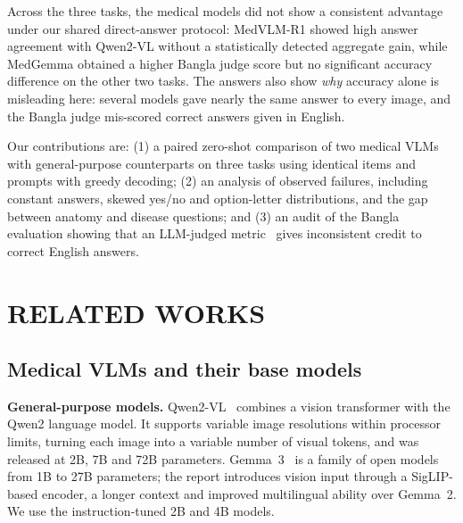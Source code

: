 \documentclass[doublecolumn]{ijcvsplatex}
\newcommand{\qwen}{Qwen2-VL}
\newcommand{\medvlm}{MedVLM-R1}
\newcommand{\gemma}{Gemma~3}
\newcommand{\medgemma}{MedGemma}
\begin{document}
Across the three tasks, the medical models did not show a consistent advantage under our shared direct-answer protocol: \medvlm{} showed high answer agreement with \qwen{} without a statistically detected aggregate gain, while \medgemma{} obtained a higher Bangla judge score but no significant accuracy difference on the other two tasks. The answers also show \emph{why} accuracy alone is misleading here: several models gave nearly the same answer to every image, and the Bangla judge mis-scored correct answers given in English.

Our contributions are: (1) a paired zero-shot comparison of two medical VLMs with general-purpose counterparts on three tasks using identical items and prompts with greedy decoding; (2) an analysis of observed failures, including constant answers, skewed yes/no and option-letter distributions, and the gap between anatomy and disease questions; and (3) an audit of the Bangla evaluation showing that an LLM-judged metric~\cite{manas2024lave} gives inconsistent credit to correct English answers.

\section{RELATED WORKS}
\label{sec_rl}

\subsection{Medical VLMs and their base models}
\textbf{General-purpose models.} \qwen{}~\cite{wang2024qwen2vl} combines a vision transformer with the Qwen2 language model. It supports variable image resolutions within processor limits, turning each image into a variable number of visual tokens, and was released at 2B, 7B and 72B parameters. \gemma{}~\cite{gemma3} is a family of open models from 1B to 27B parameters; the report introduces vision input through a SigLIP-based encoder, a longer context and improved multilingual ability over Gemma~2. We use the instruction-tuned 2B and 4B models.
\end{document}
